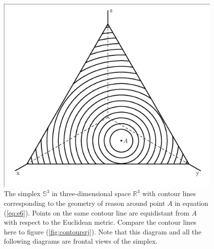 \documentclass[11pt]{article}
\begin{document}
\begin{figure}[ht]
  \begin{flushright}
    \begin{minipage}[h]{.7\linewidth}
      \includegraphics[width=\textwidth]{contourslp.eps}
      \caption{\footnotesize The simplex $\mathbb{S}^{3}$ in
        three-dimensional space $\mathbb{R}^{3}$ with contour lines
        corresponding to the geometry of reason around point $A$ in
        equation (\ref{eq:e6}). Points on the same contour line are
        equidistant from $A$ with respect to the Euclidean metric.
        Compare the contour lines here to figure
        (\ref{fig:contoursrj}). Note that this diagram and all the
        following diagrams are frontal views of the simplex.}
      \label{fig:contourslp}
    \end{minipage}
  \end{flushright}
\end{figure}
\end{document}
